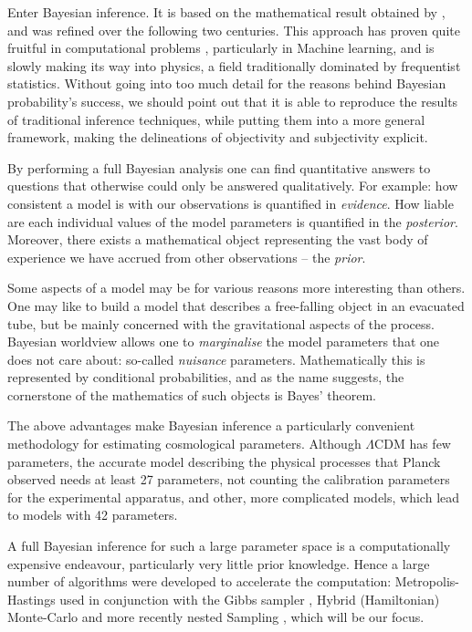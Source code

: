 \documentclass[usenatbib]{mnras}
\begin{document}
Enter Bayesian inference. It is based on the mathematical result
obtained by \cite{1763}, and was refined over the following two
centuries. This approach has proven quite fruitful in computational
problems \citep{Wolpert2004}, particularly in Machine learning, and is
slowly making its way into physics, a field traditionally dominated
by frequentist statistics. Without going into too much detail for
the reasons behind Bayesian probability's success, we should point
out that it is able to reproduce the results of traditional
inference techniques, while putting them into a more general
framework, making the delineations of objectivity and subjectivity
explicit.


By performing a full Bayesian analysis one can find quantitative
answers to questions that otherwise could only be answered
qualitatively.  For example: how consistent a model is with our
observations is quantified in \emph{evidence}. How liable are each
individual values of the model parameters is quantified in the
\emph{posterior}. Moreover, there exists a mathematical object
representing  the vast body of experience we  have accrued from
other observations -- the \emph{prior}. 

Some aspects of a model may be for various reasons more interesting
than others. One may like to build a model that describes a
free-falling object in an evacuated tube, but be mainly concerned
with the gravitational aspects of the process. Bayesian worldview
allows one to \emph{marginalise} the model parameters that one does not
care about: so-called \emph{nuisance} parameters. Mathematically this is
represented by conditional probabilities, and as the name suggests,
the cornerstone of the mathematics of such objects is Bayes'
theorem. 

The above advantages make Bayesian inference a particularly
convenient methodology for estimating cosmological
parameters. Although \(\Lambda\)CDM has few parameters, the accurate
model describing the physical processes that Planck \citep{Planck}
observed needs at least 27 parameters, not counting the calibration
parameters for the experimental apparatus, and other, more
complicated models, which lead to models with 42 parameters.

A full Bayesian inference for such a large parameter space is a
computationally expensive endeavour, particularly very little prior
knowledge. Hence a large number of algorithms were developed to
accelerate the computation: Metropolis-Hastings \citep{Metropolis}
used in conjunction with the Gibbs sampler
\citep{Metropolis-Hastings-Gibbs}, Hybrid (Hamiltonian) Monte-Carlo
\citep{1701.02434,Duane_1987} and more recently nested Sampling
\citep{Skilling2006}, which will be our focus.
\end{document}
